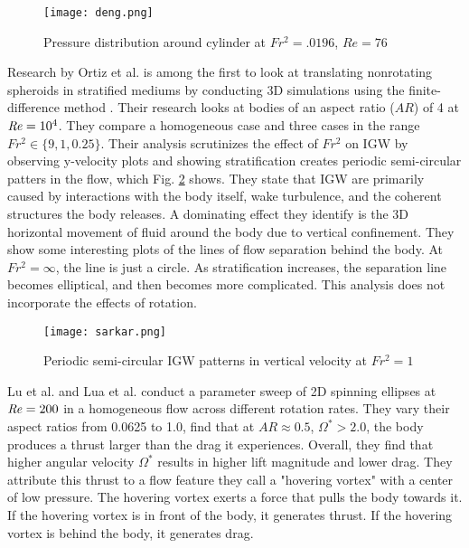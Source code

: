 \begin{figure}[htbp]
\centering
\texttt{[image: deng.png]}
\caption{Pressure distribution around cylinder at $Fr^2 = .0196$, $Re = 76$ \cite{deng_drag_2022}}
\label{fig:deng}
\end{figure}

Research by Ortiz et al. \cite{ortiz-tarin_stratified_2019} is among the first to look at translating nonrotating spheroids in stratified mediums by conducting 3D simulations using the finite-difference method . Their research looks at bodies of an aspect ratio ($AR$) of 4 at $\mathit{Re} = 10^4$. They compare a homogeneous case and three cases in the range $Fr^2 \in \{9, 1, 0.25\}$. Their analysis scrutinizes the effect of $Fr^2$ on IGW by observing y-velocity plots and showing stratification creates periodic semi-circular patters in the flow, which Fig. \ref{fig:sarkar} shows. They state that IGW are primarily caused by interactions with the body itself, wake turbulence, and the coherent structures the body releases. A dominating effect they identify is the 3D horizontal movement of fluid around the body due to vertical confinement. They show some interesting plots of the lines of flow separation behind the body. At $Fr^2 = \infty$, the line is just a circle. As stratification increases, the separation line becomes elliptical, and then becomes more complicated. This analysis does not incorporate the effects of rotation.

\begin{figure}[htbp]
\centering
\texttt{[image: sarkar.png]}
\caption{Periodic semi-circular IGW patterns in vertical velocity at $Fr^2 = 1$ \cite{ortiz-tarin_stratified_2019}}
\label{fig:sarkar}
\end{figure}

Lu et al. \cite{lu_flow_2018} and Lua et al. \cite{lua_rotating_2018} conduct a parameter sweep of 2D spinning ellipses at $\mathit{Re} = 200$ in a homogeneous flow across different rotation rates. They vary their aspect ratios from 0.0625 to 1.0, find that at $AR \approx 0.5$, $\Omega^{\ast} > 2.0$, the body produces a thrust larger than the drag it experiences. Overall, they find that higher angular velocity $\Omega^{\ast}$ results in higher lift magnitude and lower drag. They attribute this thrust to a flow feature they call a "hovering vortex" with a center of low pressure. The hovering vortex exerts a force that pulls the body towards it. If the hovering vortex is in front of the body, it generates thrust. If the hovering vortex is behind the body, it generates drag.  

